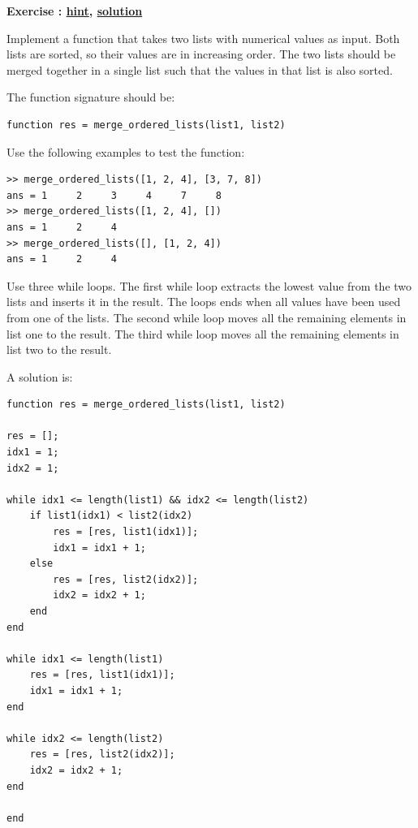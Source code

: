 \documentclass[12pt,a4paper]{article}
\makeatletter
\newcommand{\linkdest}[1]{\Hy@raisedlink{\hypertarget{#1}{}}}
\newcounter{ex}
\numberwithin{ex}{section}
\newenvironment{ex}[1][]{%
\filbreak
\bigskip
\refstepcounter{ex}
\noindent
\textbf{\linkdest{\theex{}exercise}{}Exercise \theex{}: #1\hfill\hyperlink{\theex{}hint}{hint}, \hyperlink{\theex{}solution}{solution}}\par\noindent}{}
\makeatother
\begin{document}
\begin{ex}
Implement a function that takes two lists
with numerical values as input.
Both lists are sorted, so their values are in 
increasing order.
The two lists should be merged together
in a single list such that the values in 
that list is also sorted.

The function signature should be:
\begin{lstlisting}
function res = merge_ordered_lists(list1, list2)
\end{lstlisting}
Use the following examples to test the function:
\begin{lstlisting}
>> merge_ordered_lists([1, 2, 4], [3, 7, 8])
ans = 1     2     3     4     7     8
>> merge_ordered_lists([1, 2, 4], [])
ans = 1     2     4
>> merge_ordered_lists([], [1, 2, 4])
ans = 1     2     4
\end{lstlisting}
\begin{hint}
Use three while loops.
The first while loop extracts the lowest value from 
the two lists and inserts it in the result.
The loops ends when all values have been used from 
one of the lists.
The second while loop moves all the remaining elements 
in list one to the result.
The third while loop moves all the remaining elements 
in list two to the result.
\end{hint}
\begin{sol}
A solution is:
\begin{lstlisting}
function res = merge_ordered_lists(list1, list2)

res = [];
idx1 = 1;
idx2 = 1;

while idx1 <= length(list1) && idx2 <= length(list2)
    if list1(idx1) < list2(idx2)
        res = [res, list1(idx1)];
        idx1 = idx1 + 1;
    else
        res = [res, list2(idx2)];
        idx2 = idx2 + 1;
    end
end

while idx1 <= length(list1)
    res = [res, list1(idx1)];
    idx1 = idx1 + 1;
end

while idx2 <= length(list2)
    res = [res, list2(idx2)];
    idx2 = idx2 + 1;
end

end
\end{lstlisting}
\end{sol}
\end{ex}
\end{document}
